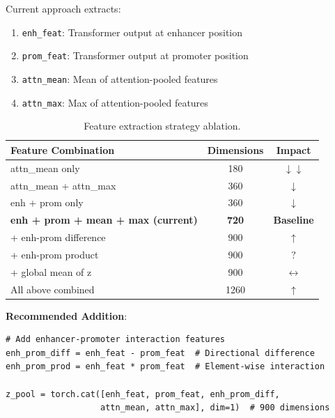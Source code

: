 \documentclass[11pt,a4paper]{article}
\begin{document}
Current approach extracts:
\begin{enumerate}
    \item \texttt{enh\_feat}: Transformer output at enhancer position
    \item \texttt{prom\_feat}: Transformer output at promoter position
    \item \texttt{attn\_mean}: Mean of attention-pooled features
    \item \texttt{attn\_max}: Max of attention-pooled features
\end{enumerate}

\begin{table}[H]
\centering
\begin{tabular}{L{5cm}cc}
\toprule
\textbf{Feature Combination} & \textbf{Dimensions} & \textbf{Impact} \\
\midrule
attn\_mean only & 180 & \textcolor{negative}{$\downarrow\downarrow$} \\
attn\_mean + attn\_max & 360 & \textcolor{negative}{$\downarrow$} \\
enh + prom only & 360 & \textcolor{negative}{$\downarrow$} \\
\textbf{enh + prom + mean + max (current)} & \textbf{720} & \textbf{Baseline} \\
+ enh-prom difference & 900 & \textcolor{positive}{$\uparrow$} \\
+ enh-prom product & 900 & \textcolor{uncertain}{$?$} \\
+ global mean of z & 900 & \textcolor{neutral}{$\leftrightarrow$} \\
All above combined & 1260 & \textcolor{positive}{$\uparrow$} \\
\bottomrule
\end{tabular}
\caption{Feature extraction strategy ablation.}
\end{table}

\textbf{Recommended Addition}:
\begin{verbatim}
# Add enhancer-promoter interaction features
enh_prom_diff = enh_feat - prom_feat  # Directional difference
enh_prom_prod = enh_feat * prom_feat  # Element-wise interaction

z_pool = torch.cat([enh_feat, prom_feat, enh_prom_diff, 
                   attn_mean, attn_max], dim=1)  # 900 dimensions
\end{verbatim}

\end{document}

